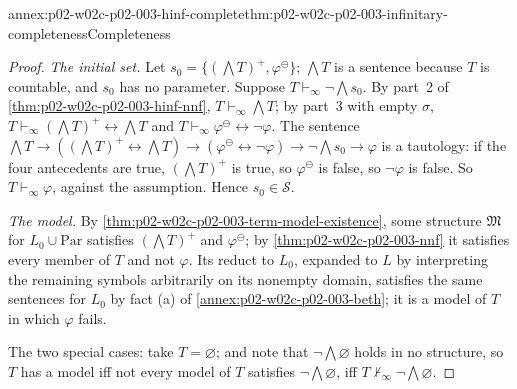 \begin{annexitem}{annex:p02-w02c-p02-003-hinf-complete}{thm:p02-w02c-p02-003-infinitary-completeness}{Completeness}
\begin{proof}
\emph{The initial set.}  Let \(s_0=\{(\bigwedge T)^{+},\varphi^{\ominus}\}\);
\(\bigwedge T\) is a sentence because \(T\) is countable, and \(s_0\) has no
parameter.  Suppose \(T\vdash_{\infty}\neg\bigwedge s_0\).  By part~2 of
\cref{thm:p02-w02c-p02-003-hinf-nnf}, \(T\vdash_{\infty}\bigwedge T\); by
part~3 with empty \(\sigma\),
\(T\vdash_{\infty}(\bigwedge T)^{+}\leftrightarrow\bigwedge T\) and
\(T\vdash_{\infty}\varphi^{\ominus}\leftrightarrow\neg\varphi\).  The
sentence \(\bigwedge T\to((\bigwedge T)^{+}\leftrightarrow\bigwedge T)\to
(\varphi^{\ominus}\leftrightarrow\neg\varphi)\to\neg\bigwedge s_0\to\varphi\)
is a tautology: if the four antecedents are true, \((\bigwedge T)^{+}\) is
true, so \(\varphi^{\ominus}\) is false, so \(\neg\varphi\) is false.  So
\(T\vdash_{\infty}\varphi\), against the assumption.  Hence
\(s_0\in\mathcal S\).

\emph{The model.}  By \cref{thm:p02-w02c-p02-003-term-model-existence},
some structure \(\mathfrak M\) for \(L_0\cup\mathrm{Par}\) satisfies
\((\bigwedge T)^{+}\) and \(\varphi^{\ominus}\); by
\cref{thm:p02-w02c-p02-003-nnf} it satisfies every member of \(T\) and not
\(\varphi\).  Its reduct to \(L_0\), expanded to \(L\) by interpreting the
remaining symbols arbitrarily on its nonempty domain, satisfies the same
sentences for \(L_0\) by fact (a) of \cref{annex:p02-w02c-p02-003-beth}; it
is a model of \(T\) in which \(\varphi\) fails.

The two special cases: take \(T=\varnothing\); and note that
\(\neg\bigwedge\varnothing\) holds in no structure, so \(T\) has a model iff
not every model of \(T\) satisfies \(\neg\bigwedge\varnothing\), iff
\(T\nvdash_{\infty}\neg\bigwedge\varnothing\).
\end{proof}
\end{annexitem}

